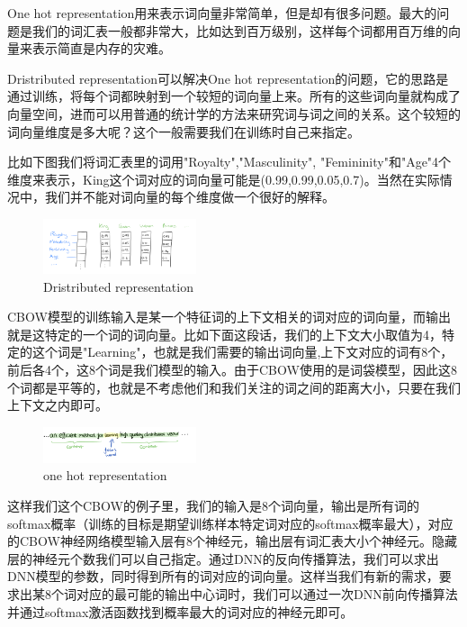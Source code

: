 \documentclass[UTF8,a4paper,10pt, twocolumn]{ctexart}
\begin{document}
One hot representation用来表示词向量非常简单，但是却有很多问题。最大的问题是我们的词汇表一般都非常大，比如达到百万级别，这样每个词都用百万维的向量来表示简直是内存的灾难。

Dristributed representation可以解决One hot representation的问题，它的思路是通过训练，将每个词都映射到一个较短的词向量上来。所有的这些词向量就构成了向量空间，进而可以用普通的统计学的方法来研究词与词之间的关系。这个较短的词向量维度是多大呢？这个一般需要我们在训练时自己来指定。

比如下图我们将词汇表里的词用"Royalty","Masculinity", "Femininity"和"Age"4个维度来表示，King这个词对应的词向量可能是(0.99,0.99,0.05,0.7)。当然在实际情况中，我们并不能对词向量的每个维度做一个很好的解释。

\begin{figure}[htbp]
  \centering
  \includegraphics[width=0.4\textwidth]{img/fig9.png}
  \caption{Dristributed representation}
  \label{figure:zju7}
  \end{figure}

CBOW模型的训练输入是某一个特征词的上下文相关的词对应的词向量，而输出就是这特定的一个词的词向量。比如下面这段话，我们的上下文大小取值为4，特定的这个词是"Learning"，也就是我们需要的输出词向量,上下文对应的词有8个，前后各4个，这8个词是我们模型的输入。由于CBOW使用的是词袋模型，因此这8个词都是平等的，也就是不考虑他们和我们关注的词之间的距离大小，只要在我们上下文之内即可。

\begin{figure}[htbp]
  \centering
  \includegraphics[width=0.4\textwidth]{img/fig10.png}
  \caption{one hot representation}
  \label{figure:zju8}
  \end{figure}

这样我们这个CBOW的例子里，我们的输入是8个词向量，输出是所有词的softmax概率（训练的目标是期望训练样本特定词对应的softmax概率最大），对应的CBOW神经网络模型输入层有8个神经元，输出层有词汇表大小个神经元。隐藏层的神经元个数我们可以自己指定。通过DNN的反向传播算法，我们可以求出DNN模型的参数，同时得到所有的词对应的词向量。这样当我们有新的需求，要求出某8个词对应的最可能的输出中心词时，我们可以通过一次DNN前向传播算法并通过softmax激活函数找到概率最大的词对应的神经元即可。
\end{document}
